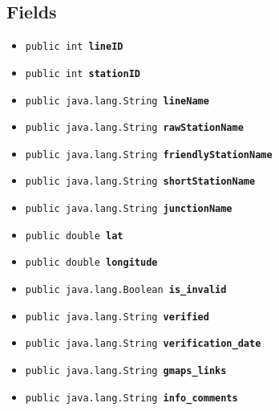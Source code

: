 \documentclass[11pt,a4paper]{report}
\begin{document}
{{{{{{{{{{{{{{{{{{\subsection{Fields}{
\begin{itemize}
\item{
\label{models.TransportStation.lineID}\hypertarget{models.TransportStation.lineID}{\texttt{public int\ {\bf  lineID}}
}
}
\item{
\label{models.TransportStation.stationID}\hypertarget{models.TransportStation.stationID}{\texttt{public int\ {\bf  stationID}}
}
}
\item{
\label{models.TransportStation.lineName}\hypertarget{models.TransportStation.lineName}{\texttt{public java.lang.String\ {\bf  lineName}}
}
}
\item{
\label{models.TransportStation.rawStationName}\hypertarget{models.TransportStation.rawStationName}{\texttt{public java.lang.String\ {\bf  rawStationName}}
}
}
\item{
\label{models.TransportStation.friendlyStationName}\hypertarget{models.TransportStation.friendlyStationName}{\texttt{public java.lang.String\ {\bf  friendlyStationName}}
}
}
\item{
\label{models.TransportStation.shortStationName}\hypertarget{models.TransportStation.shortStationName}{\texttt{public java.lang.String\ {\bf  shortStationName}}
}
}
\item{
\label{models.TransportStation.junctionName}\hypertarget{models.TransportStation.junctionName}{\texttt{public java.lang.String\ {\bf  junctionName}}
}
}
\item{
\label{models.TransportStation.lat}\hypertarget{models.TransportStation.lat}{\texttt{public double\ {\bf  lat}}
}
}
\item{
\label{models.TransportStation.longitude}\hypertarget{models.TransportStation.longitude}{\texttt{public double\ {\bf  longitude}}
}
}
\item{
\label{models.TransportStation.is_invalid}\hypertarget{models.TransportStation.is_invalid}{\texttt{public java.lang.Boolean\ {\bf  is\_invalid}}
}
}
\item{
\label{models.TransportStation.verified}\hypertarget{models.TransportStation.verified}{\texttt{public java.lang.String\ {\bf  verified}}
}
}
\item{
\label{models.TransportStation.verification_date}\hypertarget{models.TransportStation.verification_date}{\texttt{public java.lang.String\ {\bf  verification\_date}}
}
}
\item{
\label{models.TransportStation.gmaps_links}\hypertarget{models.TransportStation.gmaps_links}{\texttt{public java.lang.String\ {\bf  gmaps\_links}}
}
}
\item{
\label{models.TransportStation.info_comments}\hypertarget{models.TransportStation.info_comments}{\texttt{public java.lang.String\ {\bf  info\_comments}}
}
}
\end{itemize}
}
}}}}}}}}}}}}}}}}}}
\end{document}
